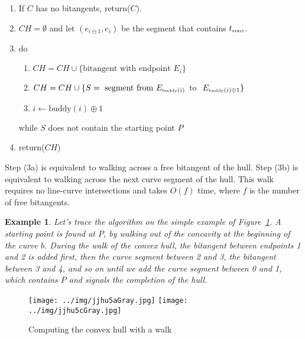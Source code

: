 \documentclass{sig-alternate}
\newtheorem{example}[theorem]{Example}
\begin{document}
\begin{enumerate}
\item 	If $C$ has no bitangents, return($C$).
\item   $CH = \emptyset$ and let 
        $(e_{i \ominus 1},e_i)$ be the segment that contains $t_{\mbox{\tiny{start}}}$.
\item	do
\begin{enumerate}
\item	$CH = CH \cup \{\mbox{bitangent with endpoint $E_i$}\} $
\item	$CH = CH \cup \{ S = \mbox{ segment from } E_{\mbox{\tiny{buddy}}(i)}$ 
  $ \mbox{to }$ $E_{\mbox{\tiny{buddy}}(i) \oplus 1} \}$
\item	$i \leftarrow \mbox{buddy}(i) \oplus 1$
\end{enumerate}
 	while $S$ does not contain the starting point $P$
\item return($CH$)
\end{enumerate}

Step (3a) is equivalent to walking across a free bitangent of the hull.
Step (3b) is equivalent to walking across the next curve segment of the hull.
This walk requires no line-curve intersections and takes $O(f)$ time, 
where $f$ is the number of free bitangents.

\begin{example}
Let's trace the algorithm on the simple example of Figure~\ref{fig:algtrace}.
A starting point is found at $P$, by walking out of the concavity
at the beginning of the curve $b$.
During the walk of the convex hull, 
the bitangent between endpoints 1 and 2 is added first,
then the curve segment between 2 and 3, the bitangent between 3 and 4,
and so on until we add the curve segment between 0 and 1,
which contains $P$ and signals the completion of the hull.
\end{example}

\begin{figure}[h]
\begin{center}
\texttt{[image: ../img/jjhu5aGray.jpg]} 
\texttt{[image: ../img/jjhu5cGray.jpg]}
\end{center}
\caption{Computing the convex hull with a walk}
\label{fig:algtrace}
\end{figure}
\end{document}
